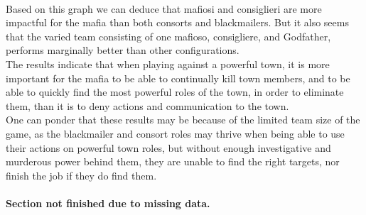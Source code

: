 \\Based on this graph we can deduce that mafiosi and consiglieri are more
impactful for the mafia than both consorts and blackmailers. But it also seems
that the varied team consisting of one mafioso, consigliere, and Godfather,
performs marginally better than other configurations. \\
The results indicate that when playing against a powerful town, it is more
important for the mafia to be able to continually kill town members, and to be
able to quickly find the most powerful roles of the town, in order to eliminate
them, than it is to deny actions and communication to the town. \\
One can ponder that these results may be because of the limited team size of
the game, as the blackmailer and consort roles may thrive when being able to
use
their actions on powerful town roles, but without enough investigative and
murderous power behind them, they are unable to find the right targets, nor
finish the job if they do find them. \\\\
\textbf{Section not finished due to missing data.}
